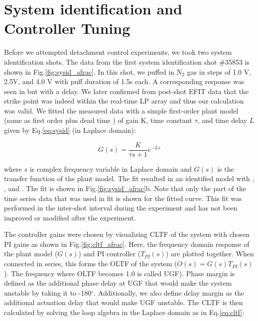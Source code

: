 








\section{System identification and Controller Tuning}
\label{sec:sysid}







Before we attempted detachment control experiments, we took two system identification shots.
The data from the first system identification shot \#35853 is shown in Fig.\ref{fig:sysid_afrac}.
In this shot, we puffed in N$_2$ gas in steps of 1.0 V, 2.5V, and 4.0 V with puff duration of 1.5s each.
A corresponding response was seen in \Afrac but with a delay.
We later confirmed from post-shot EFIT data that the strike point was indeed within the real-time \ac{LP} array and thus our \Afrac calculation was valid.
We fitted the measured data with a simple first-order plant model (same as first order plus dead time \cite{Eldon_2022_PPCF}) of gain K, time constant $\tau$, and time delay $L$ given by Eq.\ref{eq:sysid} (in Laplace domain):

\begin{equation}
 G(s) = \frac{K}{\tau s + 1}e^{-L s}
\label{eq:sysid}
\end{equation}

where $s$ is complex frequency variable in Laplace domain and $G(s)$ is the transfer function of the plant model.
The fit resulted in an identified model with \AfracK, \AfracTau, and \AfracL.
The fit is shown in Fig.\ref{fig:sysid_afrac}b.
Note that only the part of the time series data that was used in fit is shown for the fitted curve.
This fit was performed in the inter-shot interval during the experiment and has not been improved or modified after the experiment.

The controller gains were chosen by visualizing \ac{CLTF} of the system with chosen PI gains as shown in Fig.\ref{fig:cltf_afrac}.
Here, the frequency domain response of the plant model ($G(s)$) and PI controller ($T_{PI}(s)$) are plotted together.
When connected in series, this forms the \ac{OLTF} of the system ($O(s) = G(s) T_{PI}(s)$).
The frequency where \ac{OLTF} becomes 1.0 is called \ac{UGF}).
Phase margin is defined as the additional phase delay at \ac{UGF} that would make the system unstable by taking it to -180$^\circ$.
Additionally, we also define delay margin as the additional actuation delay that would make \ac{UGF} unstable.
The \ac{CLTF} is then calculated by solving the loop algebra in the Laplace domain as in Eq.\ref{eq:cltf}:

